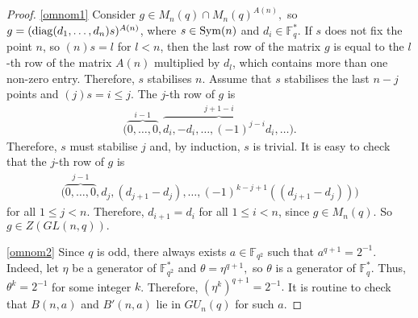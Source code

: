 \begin{proof}
\eqref{omnom1} Consider $g \in M_n(q) \cap M_n(q)^{A(n)},$ so $g=(\mathrm{diag}(d_1, \ldots, d_n)s)^{A(n)}$, where $s \in \mathrm{Sym}(n)$ and $d_i \in \mathbb{F}_q^{*}.$  If $s$ does not fix the point $n$, so $(n)s=l$ for $l<n$, then the last row of the matrix $g$ is equal to the $l$-th row of the matrix $A(n)$ multiplied by $d_l$, which contains more than one non-zero entry. Therefore, $s$ stabilises $n$.  Assume that $s$ stabilises the last ${n-j}$ points and $(j)s=i \le j.$
The  $j$-th row of $g$ is 
\begin{equation*}
\begin{split}
\bigl( \overbrace{0, \ldots, 0}^{i-1},  \overbrace{d_i,-d_i,  \ldots,(-1)^{j-i}d_i}^{j+1-i} , \ldots \bigr).
\end{split}
\end{equation*}
Therefore, $s$ must stabilise $j$ and, by induction, $s$ is trivial.  It is easy to check that the $j$-th row of  $g$ is 
\begin{equation*}
\begin{split}
\bigl( \overbrace{0, \ldots, 0}^{j-1},  d_{j},   
 ( d_{j+1} -d_{j})   ,  \ldots, (-1)^{k-j+1}((d_{j+1} - d_{j})) \bigr)
\end{split}
\end{equation*}
for all $1\le j < n$. Therefore,  $d_{i+1}=d_{i}$ for all $1\le i<n$, since $g \in M_n(q).$ So $g \in Z(GL(n,q)).$

\eqref{omnom2} Since $q$ is odd, there always exists $a \in \mathbb{F}_{q^2}$ such that $a^{q+1}=2^{-1}$. Indeed, let $\eta$ be a generator of $\mathbb{F}_{q^2}^*$ and $\theta=\eta^{q+1},$ so $\theta$ is a generator of $\mathbb{F}_q^*.$ Thus, $\theta^k=2^{-1}$ for some integer  $k$. Therefore, $(\eta^k)^{q+1}=2^{-1}.$
It is routine to check that  $B(n,a)$ and $B'(n,a)$ lie in $GU_n(q)$ for such $a.$ 



\end{proof}
